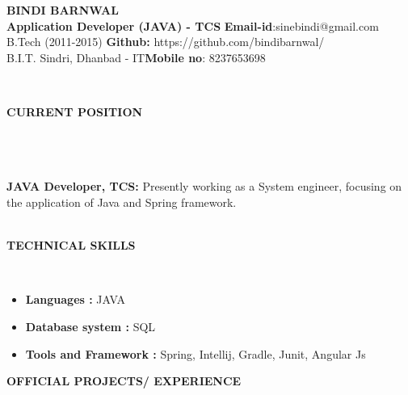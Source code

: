 \documentclass[a4paper,10pt]{article}
\newcommand{\lsep}{-0.5cm}
\newcommand{\resheading}[1]{{\small \colorbox{mygrey}{\begin{minipage}{0.975\textwidth}{\textbf{#1 \vphantom{p\^{E}}}}\end{minipage}}}}
\begin{document}
\begin{center}
\textbf{\Huge BINDI BARNWAL \\ }  
\indent \hfill \break
\indent \textbf{Application Developer (JAVA) - TCS} \hfill \textbf{Email-id}:{sinebindi@gmail.com} \\
\indent B.Tech (2011-2015)  \hfill \textbf{Github:} {https://github.com/bindibarnwal/} \\
\indent B.I.T. Sindri, Dhanbad - IT\hfill \textbf{Mobile no}: {8237653698} \\
\end{center}

\hspace{0.3cm}\\[-0.1cm]
\resheading{\textbf{CURRENT POSITION} }\\[\lsep] \\ \\
\textbf{JAVA Developer, TCS: } Presently working as a System engineer, focusing on the application of Java and Spring framework. \\
\hspace{0.5cm}\\[-0.2cm]
\resheading{\textbf{TECHNICAL SKILLS} }\\[\lsep]
\begin{itemize}
\item \textbf{Languages :} JAVA  
\item \textbf{Database system :} SQL 
\item \textbf{Tools and Framework :} Spring, Intellij, Gradle, Junit, Angular Js 
\end{itemize}
\resheading{\textbf{OFFICIAL PROJECTS/ EXPERIENCE} }\\[\lsep]
\end{document}
